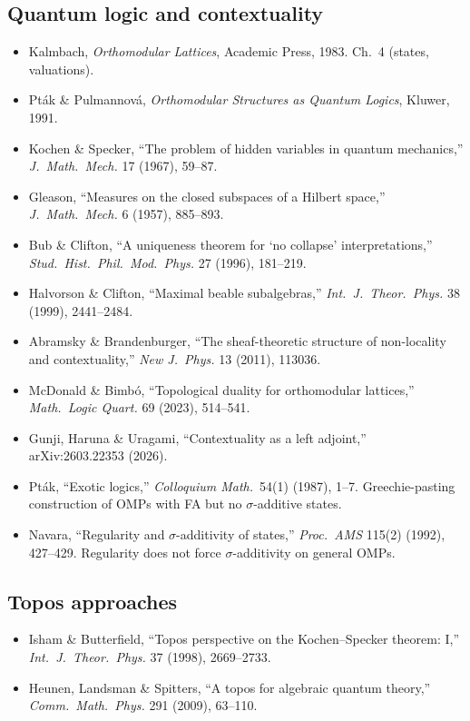 \subsection*{Quantum logic and contextuality}
\begin{itemize}
  \item Kalmbach, \emph{Orthomodular Lattices}, Academic Press, 1983.  Ch.~4 (states, valuations).~\cite{Kalmbach1983}
  \item Pt\'{a}k \& Pulmannov\'{a}, \emph{Orthomodular Structures as Quantum Logics}, Kluwer, 1991.~\cite{PtakPulmannova1991}
  \item Kochen \& Specker, ``The problem of hidden variables in quantum mechanics,'' \emph{J.\ Math.\ Mech.} 17 (1967), 59--87.~\cite{KochenSpecker1967}
  \item Gleason, ``Measures on the closed subspaces of a Hilbert space,'' \emph{J.\ Math.\ Mech.} 6 (1957), 885--893.~\cite{Gleason1957}
  \item Bub \& Clifton, ``A uniqueness theorem for `no collapse' interpretations,'' \emph{Stud.\ Hist.\ Phil.\ Mod.\ Phys.} 27 (1996), 181--219.~\cite{BubClifton1996}
  \item Halvorson \& Clifton, ``Maximal beable subalgebras,'' \emph{Int.\ J.\ Theor.\ Phys.} 38 (1999), 2441--2484.~\cite{HalvorsonClifton1999}
  \item Abramsky \& Brandenburger, ``The sheaf-theoretic structure of non-locality and contextuality,'' \emph{New J.\ Phys.} 13 (2011), 113036.~\cite{AbramskyBrandenburger2011}
  \item McDonald \& Bimb\'{o}, ``Topological duality for orthomodular lattices,'' \emph{Math.\ Logic Quart.} 69 (2023), 514--541.~\cite{McDonaldBimbo2023}
  \item Gunji, Haruna \& Uragami, ``Contextuality as a left adjoint,'' arXiv:2603.22353 (2026).~\cite{Gunji2026}
  \item Pt\'{a}k, ``Exotic logics,'' \emph{Colloquium Math.}\ 54(1) (1987), 1--7.  Greechie-pasting construction of OMPs with FA but no $\sigma$-additive states.~\cite{Ptak1987}
  \item Navara, ``Regularity and $\sigma$-additivity of states,'' \emph{Proc.\ AMS} 115(2) (1992), 427--429.  Regularity does not force $\sigma$-additivity on general OMPs.~\cite{Navara1992}
\end{itemize}

\subsection*{Topos approaches}
\begin{itemize}
  \item Isham \& Butterfield, ``Topos perspective on the Kochen--Specker theorem: I,'' \emph{Int.\ J.\ Theor.\ Phys.} 37 (1998), 2669--2733.~\cite{IshamButterfield1998}
  \item Heunen, Landsman \& Spitters, ``A topos for algebraic quantum theory,'' \emph{Comm.\ Math.\ Phys.} 291 (2009), 63--110.~\cite{HeunenLandsmanSpitters2009}
\end{itemize}

